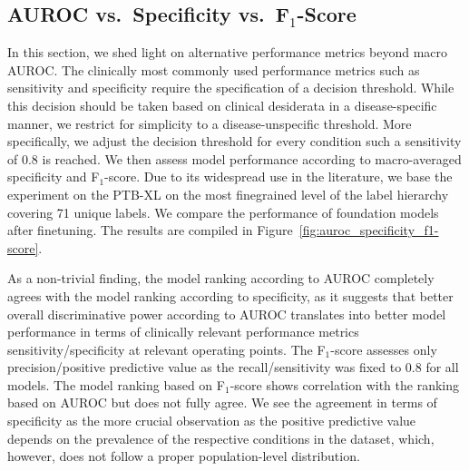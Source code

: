 \documentclass{article}
\begin{document}
        \subsection{\texorpdfstring{AUROC vs.\ Specificity vs.\ F$_{1}$-Score}{AUROC vs. Specificity vs. F1-Score}}\label{app:metrics}
        In this section, we shed light on alternative performance metrics beyond macro AUROC. The clinically most commonly used performance metrics such as sensitivity and specificity require the specification of a decision threshold. While this decision should be taken based on clinical desiderata in a disease-specific manner, we restrict for simplicity to a disease-unspecific threshold. More specifically, we adjust the decision threshold for every condition such a sensitivity of 0.8 is reached. We then assess model performance according to macro-averaged specificity and F$_{1}$-score. Due to its widespread use in the literature, we base the experiment on the PTB-XL on the most finegrained level of the label hierarchy covering 71 unique labels. We compare the performance of foundation models after finetuning. The results are compiled in Figure~\ref{fig:auroc_specificity_f1-score}.

        As a non-trivial finding, the model ranking according to AUROC completely agrees with the model ranking according to specificity, as it suggests that better overall discriminative power according to AUROC translates into better model performance in terms of clinically relevant performance metrics sensitivity/specificity at relevant operating points. The  F$_{1}$-score assesses only precision/positive predictive value as the recall/sensitivity was fixed to 0.8 for all models. The model ranking based on  F$_{1}$-score shows correlation with the ranking based on AUROC but does not fully agree. We see the agreement in terms of specificity as the more crucial observation as the positive predictive value depends on the prevalence of the respective conditions in the dataset, which, however, does not follow a proper population-level distribution.
\end{document}
